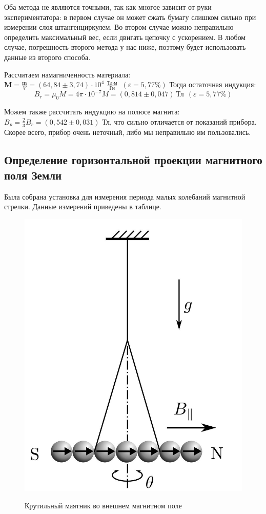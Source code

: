 \documentclass[a4paper, 12pt]{article}
\begin{document}
	Оба метода не являются точными, так как многое зависит от руки экспериментатора: в первом случае он может сжать бумагу слишком сильно при измерении слоя штангенциркулем. Во втором случае можно неправильно определить максимальный вес, если двигать цепочку с ускорением. В любом случае, погрешность второго метода у нас ниже, поэтому будет использовать данные из второго способа.
	
	Рассчитаем намагниченность материала: $\mathbf{M} = \frac{\mathbf{m}}{V} = 	(64,84 \pm 3,74) \cdot 10^4 \ \frac{\text{Тл} \cdot \text{м}}{\text{Гн}} \ \ (\varepsilon = 5,77 \%)$
	Тогда остаточная индукция: 
	\[B_r = \mu_0 M = 4\pi \cdot 10^{-7} M = (0,814 \pm 0,047) \ \text{Тл} \ \ (\varepsilon = 5,77 \%) \]
	
	Можем также рассчитать индукцию на полюсе магнита: $B_p = \frac{2}{3}B_r = (0,542 \pm 0,031)$ Тл, что сильно отличается от показаний прибора. Скорее всего, прибор очень неточный, либо мы неправильно им пользовались.
	
	\subsection*{Определение горизонтальной проекции магнитного поля Земли}
 	
	Была собрана установка для измерения периода малых колебаний магнитной стрелки. Данные измерений приведены в таблице.
	
	\begin{figure}[H]
		\centering
		\includegraphics[scale=0.15]{horiz}
		\label{horiz}
		\caption{Крутильный маятник во внешнем магнитном поле}
	\end{figure}
	
\end{document}
